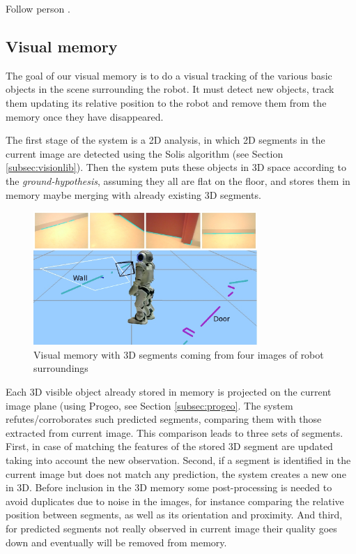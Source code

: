 \documentclass[twocolumn]{svjour3}          %
\begin{document}
Follow person \cite{canas05d}.

\subsection{Visual memory}

The goal of our visual memory is to do a visual tracking of the various basic objects in the scene surrounding the robot. It must detect new objects, track them updating its relative position to the robot and remove them from the memory once they have disappeared.

The first stage of the system is a 2D analysis, in which 2D segments in the current image are detected using the Solis algorithm \cite{solis09} (see Section \ref{subsec:visionlib}). Then the system puts these objects in 3D space according to the \textit{ground-hypothesis}, assuming they all are flat on the floor, and stores them in memory maybe merging with already existing 3D segments. 

\begin{figure}[h!]
\includegraphics[width=8.5cm]{figs/experimentoReal.jpg}
\caption{Visual memory with 3D segments coming from four images of robot surroundings}
\label{fig:memory}
\end{figure}

Each 3D visible object already stored in memory is projected on the current image plane (using Progeo, see Section \ref{subsec:progeo}. The system refutes/corroborates such predicted segments, comparing them with those extracted from current image. This comparison leads to three sets of segments. First, in case of matching the features of the stored 3D segment are updated taking into account the new observation. Second, if a segment is identified in the current image but does not match any prediction, the system creates a new one in 3D. Before inclusion in the 3D memory some post-processing is needed to avoid duplicates due to noise in the images, for instance comparing the relative position between segments, as well as its orientation and proximity. And third, for predicted segments not really observed in current image their quality goes down and eventually will be removed from memory.
\end{document}
